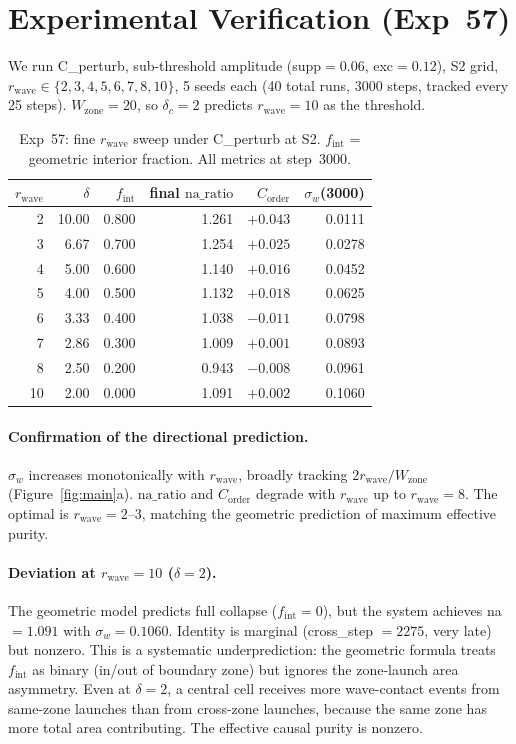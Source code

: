 \documentclass[11pt,a4paper]{article}
\newcommand{\Corder}{C_{\mathrm{order}}}
\newcommand{\sw}{\sigma_w}
\newcommand{\na}{\mathrm{na\_ratio}}
\newcommand{\fint}{f_{\mathrm{int}}}
\begin{document}
\section{Experimental Verification (Exp~57)}

We run C\_perturb, sub-threshold amplitude (supp$=0.06$, exc$=0.12$), S2 grid,
$r_\mathrm{wave} \in \{2, 3, 4, 5, 6, 7, 8, 10\}$, 5 seeds each (40 total runs,
3000 steps, tracked every 25 steps).
$W_\mathrm{zone}=20$, so $\delta_c=2$ predicts $r_\mathrm{wave}=10$ as the threshold.

\begin{table}[h]
\centering
\caption{Exp~57: fine $r_\mathrm{wave}$ sweep under C\_perturb at S2.
$\fint$ = geometric interior fraction. All metrics at step~3000.}
\label{tab:exp57}
\begin{tabular}{rrrrrr}
\toprule
$r_\mathrm{wave}$ & $\delta$ & $\fint$ & final $\na$ & $\Corder$ & $\sw$(3000) \\
\midrule
  2 & 10.00 & 0.800 & 1.261 & $+0.043$ & 0.0111 \\
  3 &  6.67 & 0.700 & 1.254 & $+0.025$ & 0.0278 \\
  4 &  5.00 & 0.600 & 1.140 & $+0.016$ & 0.0452 \\
  5 &  4.00 & 0.500 & 1.132 & $+0.018$ & 0.0625 \\
  6 &  3.33 & 0.400 & 1.038 & $-0.011$ & 0.0798 \\
  7 &  2.86 & 0.300 & 1.009 & $+0.001$ & 0.0893 \\
  8 &  2.50 & 0.200 & 0.943 & $-0.008$ & 0.0961 \\
 10 &  2.00 & 0.000 & 1.091 & $+0.002$ & 0.1060 \\
\bottomrule
\end{tabular}
\end{table}

\paragraph{Confirmation of the directional prediction.}
$\sw$ increases monotonically with $r_\mathrm{wave}$, broadly tracking
$2r_\mathrm{wave}/W_\mathrm{zone}$ (Figure~\ref{fig:main}a).
$\na$ and $\Corder$ degrade with $r_\mathrm{wave}$ up to $r_\mathrm{wave}=8$.
The optimal is $r_\mathrm{wave}=2$--$3$, matching the geometric prediction of
maximum effective purity.

\paragraph{Deviation at $r_\mathrm{wave}=10$ ($\delta=2$).}
The geometric model predicts full collapse ($\fint=0$), but the system
achieves na~$=1.091$ with $\sw=0.1060$.
Identity is marginal (cross\_step $=2275$, very late) but nonzero.
This is a systematic underprediction: the geometric formula treats $\fint$ as
binary (in/out of boundary zone) but ignores the zone-launch area asymmetry.
Even at $\delta=2$, a central cell receives more wave-contact events from
same-zone launches than from cross-zone launches, because the same zone has
more total area contributing. The effective causal purity is nonzero.
\end{document}
